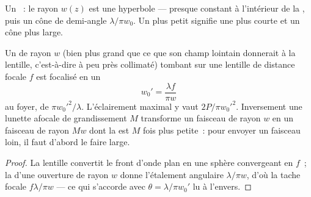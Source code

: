 \begin{omfigure}

{\small Un ~: le rayon $w(z)$ est une hyperbole --- presque
constant à l'intérieur de la , puis un cône de demi-angle
$\lambda/\pi w_0$. Un  plus petit signifie une  plus courte et un
cône plus large.}
\end{omfigure}

\begin{proposition}\label{prop:b2:laser:focus}
Un  de rayon $w$ (bien plus grand que ce que son champ lointain
donnerait à la lentille, c'est-à-dire à peu près collimaté) tombant sur une lentille de distance
focale $f$ est focalisé en un 
\[
w_0' = \frac{\lambda f}{\pi w}
\]
au foyer, de  $\pi w_0'^2/\lambda$. L'éclairement
maximal y vaut $2P/\pi w_0'^2$. Inversement une lunette afocale de
grandissement $M$ transforme un faisceau de rayon $w$ en un faisceau de rayon $Mw$
dont la  est $M$ fois plus petite~: pour envoyer un faisceau loin, il faut d'abord le
faire large.
\end{proposition}

\begin{proof}
La lentille convertit le front d'onde plan en une sphère convergeant en $f$~;
la  d'une ouverture de rayon $w$ donne l'étalement angulaire
$\lambda/\pi w$, d'où la tache focale $f\lambda/\pi w$ --- ce qui s'accorde avec
$\theta = \lambda/\pi w_0'$ lu à l'envers.
\end{proof}

